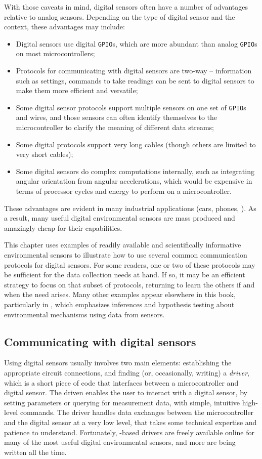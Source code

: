 With those caveats in mind, digital sensors often have a number of advantages relative to analog sensors.
Depending on the type of digital sensor and the context, these advantages may include:
\begin{itemize}
	\item Digital sensors use digital \texttt{GPIO}s, which are more abundant than analog \texttt{GPIO}s on most microcontrollers;
	\item Protocols for communicating with digital sensors are two-way -- information such as settings, commands to take readings \etc can be sent to digital sensors to make them more efficient and versatile; 
	\item Some digital sensor protocols support multiple sensors on one set of \texttt{GPIO}s and wires, and those sensors can often identify themselves to the microcontroller to clarify the meaning of different data streams;
	\item Some digital protocols support very long cables (though others are limited to very short cables);
	\item Some digital sensors do complex computations internally, such as integrating angular orientation from angular accelerations, which would be expensive in terms of processor cycles and energy to perform on a microcontroller. 
\end{itemize}
These advantages are evident in many industrial applications (cars, phones, \etc).
As a result, many useful digital environmental sensors are mass produced and amazingly cheap for their capabilities. 

This chapter uses examples of readily available and scientifically informative environmental sensors to illustrate how to use several common communication protocols for digital sensors. 
For some readers, one or two of these protocols may be sufficient for the data collection needs at hand.
If so, it may be an efficient strategy to focus on that subset of protocols, returning to learn the others if and when the need arises.
Many other examples appear elsewhere in this book, particularly in , which emphasizes inferences and hypothesis testing about environmental mechanisms using data from sensors.

\subsection{Communicating with digital sensors}
Using digital sensors usually involves two main elements: establishing the appropriate circuit connections, and finding (or, occasionally, writing) a \emph{driver}, which is a short piece of code that interfaces between a microcontroller and digital sensor.
The driven enables the user to interact with a digital sensor, \eg by setting parameters or querying for measurement data, with simple, intuitive high-level \Micropython commands.
The driver handles data exchanges between the microcontroller and the digital sensor at a very low level, that takes some technical expertise and patience to understand.
Fortunately, \Micropython-based drivers are freely available online for many of the most useful digital environmental sensors, and more are being written all the time.

